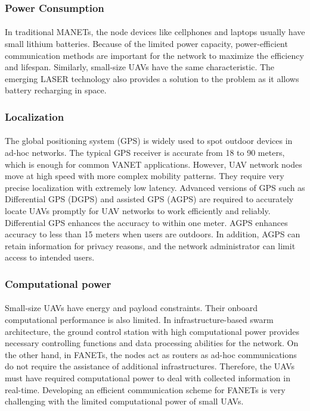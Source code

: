\documentclass[a4paper,12pt]{report}
\begin{document}
\subsubsection{Power Consumption}
\paragraph{}
In traditional MANETs, the node devices like cellphones and laptops usually have small lithium batteries. Because of the limited power capacity, power-efficient communication methods are important for the network to maximize the efficiency and lifespan\cite{lashari}. Similarly, small-size UAVs have the same characteristic. The emerging LASER technology also provides a solution to the problem as it allows battery recharging in space\cite{zhao2020efficiency}. 

\subsubsection{Localization}
\paragraph{}
The global positioning system (GPS) is widely used to spot outdoor devices in ad-hoc networks. The typical GPS receiver is accurate from 18 to 90 meters\cite{993780}, which is enough for common VANET applications. However, UAV network nodes move at high speed with more complex mobility patterns. They require very precise localization with extremely low latency\cite{lashari}. Advanced versions of GPS such as Differential GPS (DGPS) and assisted GPS (AGPS) are required to accurately locate UAVs promptly for UAV networks to work efficiently and reliably. Differential GPS enhances the accuracy to within one meter. AGPS enhances accuracy to less than 15 meters when users are outdoors. In addition, AGPS can retain information for privacy reasons, and the network administrator can limit access to intended users\cite{993780}.

\subsubsection{Computational power}
\paragraph{}
Small-size UAVs have energy and payload constraints. Their onboard computational performance is also limited. In infrastructure-based swarm architecture, the ground control station with high computational power provides necessary controlling functions and data processing abilities for the network. On the other hand, in FANETs, the nodes act as routers as ad-hoc communications do not require the assistance of additional infrastructures. Therefore, the UAVs must have required computational power to deal with collected information in real-time. Developing an efficient communication scheme for FANETs is very challenging with the limited computational power of small UAVs.
\end{document}
